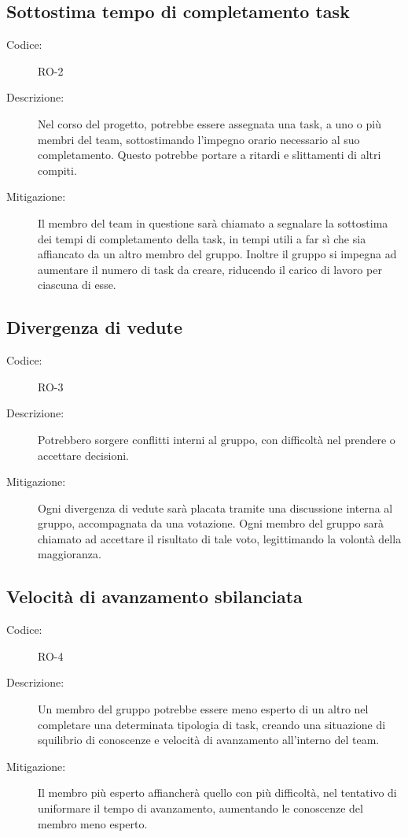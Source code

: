 \subsection*{Sottostima tempo di completamento task}
\begin{description}
    \item[Codice:] RO-2
    \item[Descrizione:] Nel corso del progetto, potrebbe essere assegnata una task, a uno o più membri del team, sottostimando l'impegno orario necessario al suo completamento. Questo potrebbe portare a ritardi e slittamenti di altri compiti.
    \item[Mitigazione:] Il membro del team in questione sarà chiamato a segnalare la sottostima dei tempi di completamento della task, in tempi utili a far sì che sia affiancato da un altro membro del gruppo. Inoltre il gruppo si impegna ad aumentare il numero di task da creare, riducendo il carico di lavoro per ciascuna di esse.
\end{description}

\subsection*{Divergenza di vedute}
\begin{description}
    \item[Codice:] RO-3
    \item[Descrizione:] Potrebbero sorgere conflitti interni al gruppo, con difficoltà nel prendere o accettare decisioni.
    \item[Mitigazione:] Ogni divergenza di vedute sarà placata tramite una discussione interna al gruppo, accompagnata da una votazione. Ogni membro del gruppo sarà chiamato ad accettare il risultato di tale voto, legittimando la volontà della maggioranza.
\end{description}

\subsection*{Velocità di avanzamento sbilanciata}
\begin{description}
    \item[Codice:] RO-4
    \item[Descrizione:] Un membro del gruppo potrebbe essere meno esperto di un altro nel completare una determinata tipologia di task, creando una situazione di squilibrio di conoscenze e velocità di avanzamento all'interno del team.
    \item[Mitigazione:] Il membro più esperto affiancherà quello con più difficoltà, nel tentativo di uniformare il tempo di avanzamento, aumentando le conoscenze del membro meno esperto.
\end{description}

